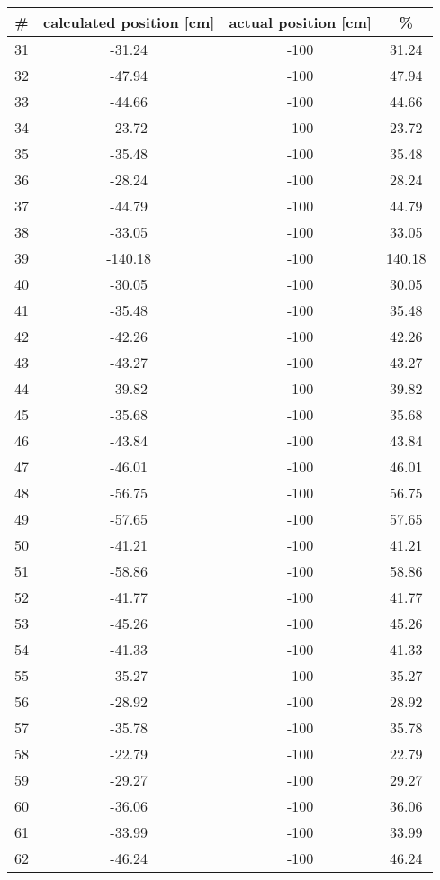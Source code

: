  \begin{tabular}{|c|c|c|c|}
  \hline 
  \# & calculated position [cm] & actual position [cm] & \% \\ 
  \hline
 31 & -31.24 & -100  & 31.24  \\ \hline
 32 & -47.94 & -100  & 47.94  \\ \hline
 33 & -44.66 & -100  & 44.66  \\ \hline
 34 & -23.72 & -100  & 23.72  \\ \hline
 35 & -35.48 & -100  & 35.48  \\ \hline
 36 & -28.24 & -100  & 28.24  \\ \hline
 37 & -44.79 & -100  & 44.79  \\ \hline
 38 & -33.05 & -100  & 33.05  \\ \hline
 39 & -140.18& -100  & 140.18 \\ \hline
 40 & -30.05 & -100  & 30.05  \\ \hline
 41 & -35.48 & -100  & 35.48  \\ \hline
 42 & -42.26 & -100  & 42.26  \\ \hline
 43 & -43.27 & -100  & 43.27  \\ \hline
 44 & -39.82 & -100  & 39.82  \\ \hline
 45 & -35.68 & -100  & 35.68  \\ \hline
 46 & -43.84 & -100  & 43.84  \\ \hline
 47 & -46.01 & -100  & 46.01  \\ \hline
 48 & -56.75 & -100  & 56.75  \\ \hline
 49 & -57.65 & -100  & 57.65  \\ \hline
 50 & -41.21 & -100  & 41.21  \\ \hline
 51 & -58.86 & -100  & 58.86  \\ \hline
 52 & -41.77 & -100  & 41.77  \\ \hline
 53 & -45.26 & -100  & 45.26  \\ \hline
 54 & -41.33 & -100  & 41.33  \\ \hline
 55 & -35.27 & -100  & 35.27  \\ \hline
 56 & -28.92 & -100  & 28.92  \\ \hline
 57 & -35.78 & -100  & 35.78  \\ \hline
 58 & -22.79 & -100  & 22.79  \\ \hline
 59 & -29.27 & -100  & 29.27  \\ \hline
 60 & -36.06 & -100  & 36.06  \\ \hline
 61 & -33.99 & -100  & 33.99  \\ \hline
 62 & -46.24 & -100  & 46.24  \\ \hline %
 \end{tabular}
 

